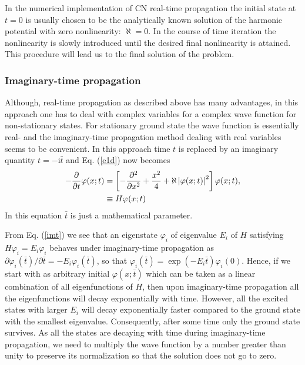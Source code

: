 \documentclass[onecolumn]{elsart3p}
\begin{document}
In the numerical implementation of CN real-time propagation the
initial state at $t=0$ is usually chosen to be the analytically known
solution of the harmonic potential with zero nonlinearity: 
$
\aleph  %
=0$. In the course of time iteration the nonlinearity is slowly
introduced until the desired final nonlinearity is attained. This
procedure will lead us to the final solution of the problem.


\subsubsection{Imaginary-time propagation}
\label{IT}

Although, real-time propagation as described above has many
advantages, in this approach one has to deal with complex variables
for a complex wave function for non-stationary states. For stationary
ground
state the wave function is essentially real- and the imaginary-time
propagation method dealing with real variables  seems to be
convenient. In this approach time $t$ is replaced by an imaginary
quantity $t=- \mbox{i}\bar t$ and Eq. (\ref{e1d}) now becomes
\begin{align}
-\frac{\partial }{\partial \bar  t} \varphi (x;\bar t) & =
\left[-\frac{\partial^2}
{\partial x^2}+\frac{x^2}{4}+\aleph  %
\left|
{\varphi(x;\bar t)}
\right| ^2\right] \varphi (x;\bar t), \notag \\
& \equiv H  \varphi (x;\bar t)
\label{imt}
\end{align}
In this equation $\bar t$ is just  a mathematical parameter. 

{From Eq. (\ref{imt}) we see that an eigenstate 
$\varphi_i$ of eigenvalue $E_i$ 
of $H$ satisfying $H\varphi_i=E_i\varphi_i$ behaves under imaginary-time 
propagation as $\partial \varphi_i(\bar t) /\partial \bar t= -E_i 
\varphi_i(\bar t)$, so 
that  $\varphi_i(\bar t)= \exp(-E_i\bar t)\varphi_i( 0)$. Hence,  if we 
start 
with as arbitrary initial  $\varphi (x;\bar t)$ which can be taken as a 
linear combination of all eigenfunctions of $H$, then upon 
imaginary-time propagation all the eigenfunctions will decay 
exponentially with 
time. However, all the excited states with larger $E_i$ will decay 
exponentially faster compared to the ground state with the smallest 
eigenvalue. Consequently, after some time only the ground state 
survives. As all the states are decaying with time during 
imaginary-time propagation, we need to multiply the wave function by a 
number 
greater than unity to preserve its normalization so that the solution 
does not go to zero.}
\end{document}
